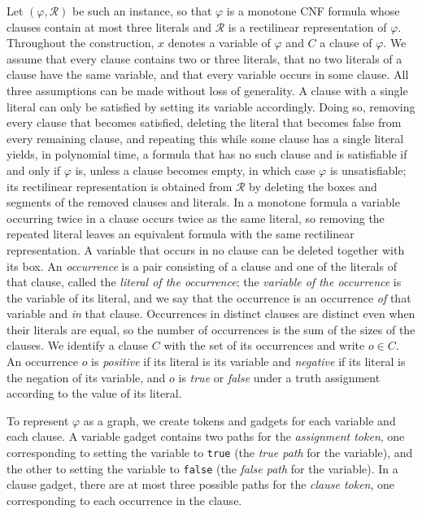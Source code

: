 \documentclass[a4paper,USenglish,thm-restate]{lipics-v2021}
\theoremstyle{problemstyle}
\begin{document}
Let $(\varphi,\mathcal{R})$ be such an instance, so that $\varphi$ is a
monotone CNF formula whose clauses contain at most three literals and
$\mathcal{R}$ is a rectilinear representation of $\varphi$. Throughout the
construction, $x$ denotes a variable of $\varphi$ and $C$ a clause of
$\varphi$. We assume that every clause contains two or three literals, that no two
literals of a clause have the same variable, and that every variable occurs
in some clause. All three assumptions can be made without loss of
generality. A clause with a single literal can only be satisfied by setting its
variable accordingly. Doing so, removing every clause that becomes satisfied,
deleting the literal that becomes false from every remaining clause, and repeating
this while some clause has a single literal yields, in polynomial time, a
formula that has no such clause and is satisfiable if and only if $\varphi$ is,
unless a clause becomes empty, in which case $\varphi$ is unsatisfiable; its
rectilinear representation is obtained from $\mathcal{R}$ by deleting the
boxes and segments of the removed clauses and literals. In a
monotone formula a variable occurring twice in a clause occurs twice as the
same literal, so removing the repeated literal leaves an equivalent formula with the
same rectilinear representation. A variable that occurs in no clause can be
deleted together with its box. An \emph{occurrence} is a pair consisting of a
clause and one of the literals of that clause, called the \emph{literal of the
occurrence}; the \emph{variable of the occurrence} is the variable of its
literal, and we say that the occurrence is an occurrence \emph{of} that
variable and \emph{in} that clause. Occurrences in distinct clauses are
distinct even when their literals are equal, so the number of occurrences is
the sum of the sizes of the clauses. We identify a clause $C$ with the set of
its occurrences and write $o\in C$. An occurrence $o$ is \emph{positive} if
its literal is its variable and \emph{negative} if its literal is the
negation of its variable, and $o$ is \emph{true} or \emph{false} under a
truth assignment according to the value of its literal.

To represent $\varphi$ as a graph, we create tokens and gadgets for each variable and each clause. A variable gadget contains two paths for the \emph{assignment token}, one corresponding to setting the variable to \texttt{true} (the \emph{true path} for the variable), and the other to setting the variable to \texttt{false} (the \emph{false path} for the variable). In a clause gadget, there are at most three possible paths for the \emph{clause token}, one corresponding to each occurrence in the clause.
\end{document}
